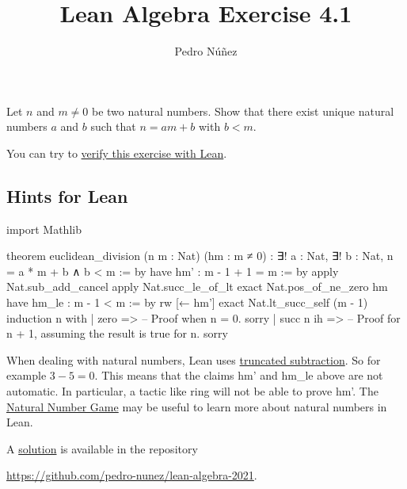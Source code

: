 \documentclass[12pt, a4paper]{article}
\title{Lean Algebra Exercise 4.1}
\author{Pedro N\'{u}\~{n}ez}
\theoremstyle{definition}
\newenvironment{xca}[1] {\renewcommand\theinnercustomthm{#1}\innercustomthm}
  {\endinnercustomthm}
\begin{document}
\begin{xca}{4.1}
  Let $n$ and $m \neq 0$ be two natural numbers.
  Show that there exist unique natural numbers $a$ and $b$ such that $n = am + b$ with $b < m$.

  You can try to \href{https://live.lean-lang.org/#codez=JYWwDg9gTgLgBAWQIYwBYBtgCMBQO0Cm0BIcBArgMaYAmBSAdgPo3ABuwAzsBA3ABR9SALjgA5FAEoBqEXFKADIjgAGacJxxNcQMBEAQjhI4oiTAA0O%2FViPiU5vgF4DcAFTy4AajhXA5ERe4AHjdhRywATw04VCQ2AkiQAHJrUgBaOABGD3S4RxEQ8K0DMDB0UJsYADpOciwmJBoaJkpGSgJ0CM0kIpKyyqpKJnQCJggAMwGYdrIADyRKeBNyyE5hsYYhgC8CKAg4iKiYuIHY0RSswNyvfK0oAHc4AG1ABMI4%2BIBdSYIZuZ70GCYqyj9TitEYCU5pSQRYAMGhUGA8Ph8G7ANARAA%2BcE222yAD5JslUgAFbajOA3VAERHZFTlSacaBQK4YgGUOB8YCoXH4okk0EjaBszJpcxIThVEDQgDmcEIcCgBCqvzgXBlUHIsX5UDZtIK9KgjKAA}{verify this exercise with Lean}.
\end{xca}

\subsection*{Hints for Lean}

\begin{leancode}
  import Mathlib

  theorem euclidean_division (n m : Nat) (hm : m ≠ 0) :
      ∃! a : Nat, ∃! b : Nat, n = a * m + b ∧ b < m := by
    have hm' : m - 1 + 1 = m := by
      apply Nat.sub_add_cancel
      apply Nat.succ_le_of_lt
      exact Nat.pos_of_ne_zero hm
    have hm_le : m - 1 < m := by
      rw [← hm']
      exact Nat.lt_succ_self (m - 1)
    induction n with
    | zero =>
      -- Proof when n = 0.
      sorry
    | succ n ih =>
      -- Proof for n + 1, assuming the result is true for n.
      sorry
\end{leancode}

When dealing with natural numbers, Lean uses \href{https://lean-lang.org/doc/reference/latest/Basic-Types/Natural-Numbers/#Nat___sub}{truncated subtraction}.
So for example $3 - 5 = 0$.
This means that the claims {\ttfamily hm'} and {\ttfamily hm\_le} above are not automatic.
In particular, a tactic like {\ttfamily ring} will not be able to prove {\ttfamily hm'}.
The \href{https://adam.math.hhu.de/#/g/leanprover-community/nng4}{Natural Number Game} may be useful to learn more about natural numbers in Lean.

A \href{https://github.com/pedro-nunez/lean-algebra-2021/blob/master/euclidean-division/solution.lean}{solution} is available in the repository
\begin{center}
  \href{https://github.com/pedro-nunez/lean-algebra-2021}{https://github.com/pedro-nunez/lean-algebra-2021}.
\end{center}

{\renewcommand{\thefootnote}{\fnsymbol{footnote}}}
\end{document}
